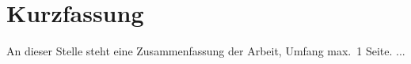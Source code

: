 \chapter{Kurzfassung}

\begin{german}
An dieser Stelle steht eine Zusammenfassung der Arbeit, Umfang
max.\ 1 Seite. 
...
\end{german}